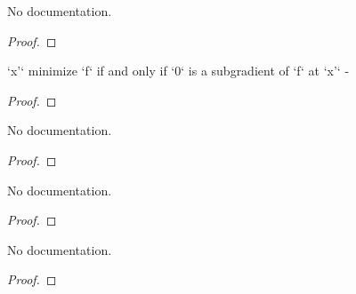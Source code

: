 \begin{theorem}\label{isMinOn_of_HasSubgradentAt_zero}
        \leanok
                No documentation.
    \end{theorem}

\begin{proof}
    \leanok
\end{proof}

\begin{theorem}\label{HasSubgradientAt_zero_iff_isMinOn}
        \leanok
                `x'` minimize `f` if and only if `0` is a subgradient of `f` at `x'` -
    \end{theorem}

\begin{proof}
    \leanok
\end{proof}

\begin{theorem}\label{HasSubgradientWithinAt_zero_of_isMinOn}
        \leanok
                No documentation.
    \end{theorem}

\begin{proof}
    \leanok
\end{proof}

\begin{theorem}\label{isMinOn_of_HasSubgradentWithinAt_zero}
        \leanok
                No documentation.
    \end{theorem}

\begin{proof}
    \leanok
\end{proof}

\begin{theorem}\label{HasSubgradientWithinAt_zero_iff_isMinOn}
        \leanok
                No documentation.
    \end{theorem}

\begin{proof}
    \leanok
\end{proof}

